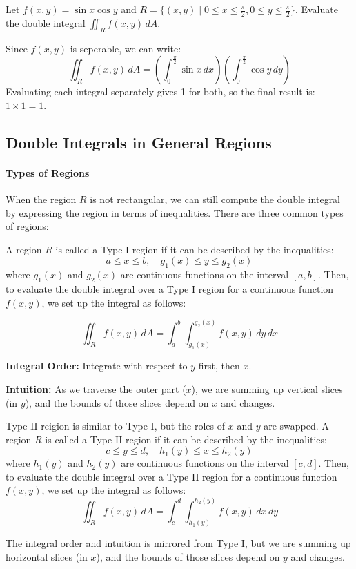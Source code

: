 \documentclass[11pt]{report}
\begin{document}
\begin{example}
    Let $f(x,y) = \sin{x} \cos{y}$ and $R = \{ (x,y) \mid 0 \le x \le \frac{\pi}{2}, 0 \le y \le \frac{\pi}{2} \}$. Evaluate the double integral $\iint_R f(x,y) \, dA$.

    Since $f(x,y)$ is seperable, we can write:
    $$
        \iint_R f(x,y) \, dA = \left( \int_0^{\frac{\pi}{2}} \sin{x} \, dx \right) \left( \int_0^{\frac{\pi}{2}} \cos{y} \, dy \right)
    $$
    Evaluating each integral separately gives 1 for both, so the final result is: $1 \times 1 = 1$.
\end{example}
\subsection{Double Integrals in General Regions}
\paragraph{Types of Regions} When the region $R$ is not rectangular, we can still compute the double integral by expressing the region in terms of inequalities. There are three common types of regions:
\begin{definition}
    A region $R$ is called a Type I region if it can be described by the inequalities:
    $$
        a \le x \le b, \quad g_1(x) \le y \le g_2(x)
    $$
    where $g_1(x)$ and $g_2(x)$ are continuous functions on the interval $[a,b]$. Then, to evaluate the double integral over a Type I region for a continuous function $f(x,y)$, we set up the integral as follows:

    \begin{equation}
        \iint_R f(x,y) \, dA = \int_a^b \int_{g_1(x)}^{g_2(x)} f(x,y) \, dy \, dx
    \end{equation}

    \textbf{Integral Order:} Integrate with respect to $y$ first, then $x$.

    \textbf{Intuition:} As we traverse the outer part ($x$), we are summing up vertical slices (in $y$), and the bounds of those slices depend on $x$ and changes.
\end{definition}

\begin{definition}
    Type II reigion is similar to Type I, but the roles of $x$ and $y$ are swapped. A region $R$ is called a Type II region if it can be described by the inequalities:
    $$
        c \le y \le d, \quad h_1(y) \le x \le h_2(y)
    $$
    where $h_1(y)$ and $h_2(y)$ are continuous functions on the interval $[c,d]$. Then, to evaluate the double integral over a Type II region for a continuous function $f(x,y)$, we set up the integral as follows: 
    \begin{equation}
        \iint_R f(x,y) \, dA = \int_c^d \int_{h_1(y)}^{h_2(y)} f(x,y) \, dx \, dy
    \end{equation}

    The integral order and intuition is mirrored from Type I, but we are summing up horizontal slices (in $x$), and the bounds of those slices depend on $y$ and changes.
\end{definition}
\end{document}
